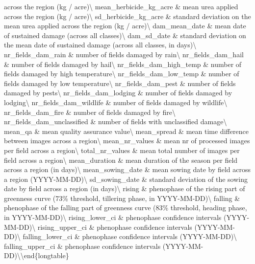\documentclass[
  landscape]{article}
\begin{document}
across the region (kg / acre)\textbackslash{} mean\_herbicide\_kg\_acre
\& mean urea applied across the region (kg / acre)\textbackslash{}
sd\_herbicide\_kg\_acre \& standard deviation on the mean urea applied
across the region (kg / acre)\textbackslash{} dam\_mean\_date \& mean
date of sustained damage (across all classes)\textbackslash{}
dam\_sd\_date \& standard deviation on the mean date of sustained damage
(across all classes, in days)\textbackslash{} \addlinespace
nr\_fields\_dam\_rain \& number of fields damaged by
rain\textbackslash{} nr\_fields\_dam\_hail \& number of fields damaged
by hail\textbackslash{} nr\_fields\_dam\_high\_temp \& number of fields
damaged by high temperature\textbackslash{} nr\_fields\_dam\_low\_temp
\& number of fields damaged by low temperature\textbackslash{}
nr\_fields\_dam\_pest \& number of fields damaged by
pests\textbackslash{} \addlinespace nr\_fields\_dam\_lodging \& number
of fields damaged by lodging\textbackslash{} nr\_fields\_dam\_wildlife
\& number of fields damaged by wildlife\textbackslash{}
nr\_fields\_dam\_fire \& number of fields damaged by
fire\textbackslash{} nr\_fields\_dam\_unclassified \& number of fields
with unclassified damage\textbackslash{} mean\_qa \& mean quality
assurance value\textbackslash{} \addlinespace mean\_spread \& mean time
difference between images across a region\textbackslash{}
mean\_nr\_values \& mean nr of processed images per field across a
region\textbackslash{} total\_nr\_values \& mean total number of images
per field across a region\textbackslash{} mean\_duration \& mean
duration of the season per field across a region (in
days)\textbackslash{} mean\_sowing\_date \& mean sowing date by field
across a region (YYYY-MM-DD)\textbackslash{} \addlinespace
sd\_sowing\_date \& standard deviation of the sowing date by field
across a region (in days)\textbackslash{} rising \& phenophase of the
rising part of greenness curve (73\% threshold, tillering phase, in
YYYY-MM-DD)\textbackslash{} falling \& phenophase of the falling part of
greenness curve (83\% threshold, heading phase, in
YYYY-MM-DD)\textbackslash{} rising\_lower\_ci \& phenophase confidence
intervals (YYYY-MM-DD)\textbackslash{} rising\_upper\_ci \& phenophase
confidence intervals (YYYY-MM-DD)\textbackslash{} \addlinespace
falling\_lower\_ci \& phenophase confidence intervals
(YYYY-MM-DD)\textbackslash{} falling\_upper\_ci \& phenophase confidence
intervals (YYYY-MM-DD)\textbackslash* \textbackslash end\{longtable\}
\end{document}

